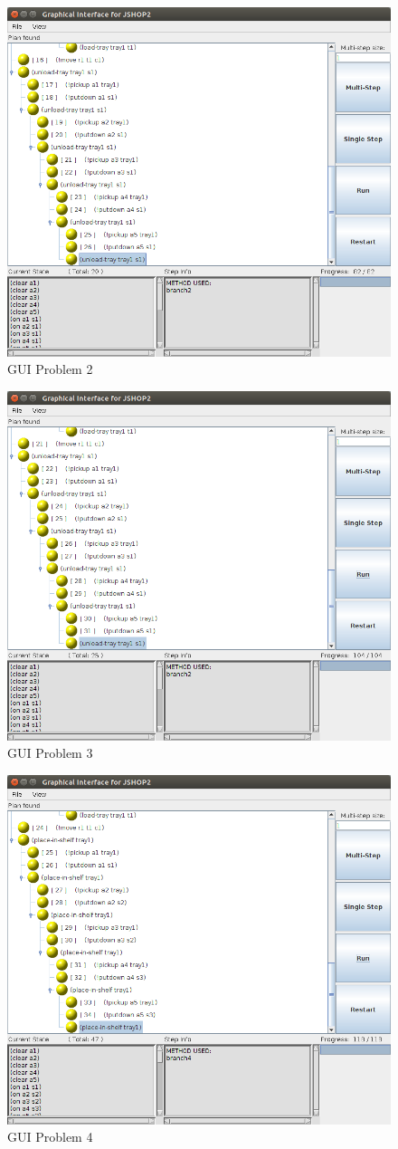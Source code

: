 \documentclass[paper=a4, fontsize=11pt]{scrartcl}
\begin{document}
	\begin{figure}[h!]
	\centering
	\includegraphics[width=0.65\linewidth]{images/problem2_gui}
	\caption{GUI Problem 2}
	\label{fig:problem2_gui}
	\end{figure}


	\begin{figure}[h!]
	\centering
	\includegraphics[width=0.65\linewidth]{images/problem3_gui}
	\caption{GUI Problem 3}
	\label{fig:problem3_gui}
	\end{figure}

	\begin{figure}[h!]
	\centering
	\includegraphics[width=0.65\linewidth]{images/problem4_gui}
	\caption{GUI Problem 4}
	\label{fig:problem4_gui}
	\end{figure}
\end{document}
